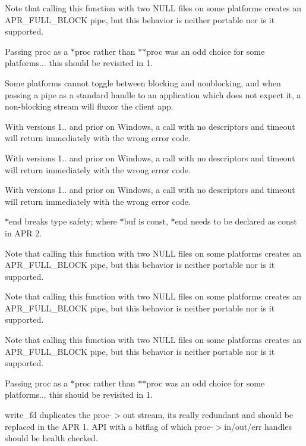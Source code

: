 \begin{DoxyRefList}
Note that calling this function with two N\+U\+LL files on some platforms creates an A\+P\+R\+\_\+\+F\+U\+L\+L\+\_\+\+B\+L\+O\+CK pipe, but this behavior is neither portable nor is it supported.

Passing proc as a $\ast$proc rather than $\ast$$\ast$proc was an odd choice for some platforms... this should be revisited in 1.  
\item[\label{bug__bug000002}%
\Hypertarget{bug__bug000002}%
Member \mbox{\hyperlink{group__apr__time_ga57bfe39a9516843a151a65cd02f84616}{A\+P\+R\+\_\+\+D\+E\+C\+L\+A\+RE}} (apr\+\_\+status\+\_\+t) apr\+\_\+time\+\_\+ansi\+\_\+put(apr\+\_\+time\+\_\+t $\ast$result]Some platforms cannot toggle between blocking and nonblocking, and when passing a pipe as a standard handle to an application which does not expect it, a non-\/blocking stream will fluxor the client app. 

With versions 1.. and prior on Windows, a call with no descriptors and timeout will return immediately with the wrong error code. 

With versions 1.. and prior on Windows, a call with no descriptors and timeout will return immediately with the wrong error code. 

With versions 1.. and prior on Windows, a call with no descriptors and timeout will return immediately with the wrong error code. 

$\ast$end breaks type safety; where $\ast$buf is const, $\ast$end needs to be declared as const in A\+PR 2. 

Note that calling this function with two N\+U\+LL files on some platforms creates an A\+P\+R\+\_\+\+F\+U\+L\+L\+\_\+\+B\+L\+O\+CK pipe, but this behavior is neither portable nor is it supported.

Note that calling this function with two N\+U\+LL files on some platforms creates an A\+P\+R\+\_\+\+F\+U\+L\+L\+\_\+\+B\+L\+O\+CK pipe, but this behavior is neither portable nor is it supported.

Note that calling this function with two N\+U\+LL files on some platforms creates an A\+P\+R\+\_\+\+F\+U\+L\+L\+\_\+\+B\+L\+O\+CK pipe, but this behavior is neither portable nor is it supported.

Passing proc as a $\ast$proc rather than $\ast$$\ast$proc was an odd choice for some platforms... this should be revisited in 1.  
\item[\label{bug__bug000011}%
\Hypertarget{bug__bug000011}%
Member \mbox{\hyperlink{group__apr__time_ga82e8a0064bc8dd25ef73f39ea428a585}{A\+P\+R\+\_\+\+D\+E\+C\+L\+A\+RE}} (void) apr\+\_\+sleep(apr\+\_\+interval\+\_\+time\+\_\+t t)]write\+\_\+fd duplicates the proc-\/$>$out stream, it\textquotesingle{}s really redundant and should be replaced in the A\+PR 1. A\+PI with a bitflag of which proc-\/$>$in/out/err handles should be health checked. 


\end{DoxyRefList}
